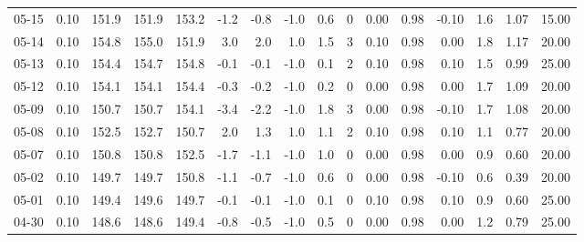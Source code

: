 \begin{threeparttable}
{\begin{tabular}{lrrrrrrrrrrrrrrr}
  05-15 &     0.10 & 151.9 & 151.9 & 153.2 &       -1.2 &           -0.8 &                     -1.0 &                 0.6 &              0 &       0.00 &      0.98 &          -0.10 &              1.6 &            1.07 &                  15.00 \\
  05-14 &     0.10 & 154.8 & 155.0 & 151.9 &        3.0 &            2.0 &                      1.0 &                 1.5 &              3 &       0.10 &      0.98 &           0.00 &              1.8 &            1.17 &                  20.00 \\
  05-13 &     0.10 & 154.4 & 154.7 & 154.8 &       -0.1 &           -0.1 &                     -1.0 &                 0.1 &              2 &       0.10 &      0.98 &           0.10 &              1.5 &            0.99 &                  25.00 \\
  05-12 &     0.10 & 154.1 & 154.1 & 154.4 &       -0.3 &           -0.2 &                     -1.0 &                 0.2 &              0 &       0.00 &      0.98 &           0.00 &              1.7 &            1.09 &                  20.00 \\
  05-09 &     0.10 & 150.7 & 150.7 & 154.1 &       -3.4 &           -2.2 &                     -1.0 &                 1.8 &              3 &       0.00 &      0.98 &          -0.10 &              1.7 &            1.08 &                  20.00 \\
  05-08 &     0.10 & 152.5 & 152.7 & 150.7 &        2.0 &            1.3 &                      1.0 &                 1.1 &              2 &       0.10 &      0.98 &           0.10 &              1.1 &            0.77 &                  20.00 \\
  05-07 &     0.10 & 150.8 & 150.8 & 152.5 &       -1.7 &           -1.1 &                     -1.0 &                 1.0 &              0 &       0.00 &      0.98 &           0.00 &              0.9 &            0.60 &                  20.00 \\
  05-02 &     0.10 & 149.7 & 149.7 & 150.8 &       -1.1 &           -0.7 &                     -1.0 &                 0.6 &              0 &       0.00 &      0.98 &          -0.10 &              0.6 &            0.39 &                  20.00 \\
  05-01 &     0.10 & 149.4 & 149.6 & 149.7 &       -0.1 &           -0.1 &                     -1.0 &                 0.1 &              0 &       0.10 &      0.98 &           0.10 &              0.9 &            0.60 &                  25.00 \\
  04-30 &     0.10 & 148.6 & 148.6 & 149.4 &       -0.8 &           -0.5 &                     -1.0 &                 0.5 &              0 &       0.00 &      0.98 &           0.00 &              1.2 &            0.79 &                  25.00 \\

\end{tabular}}
\end{threeparttable}
